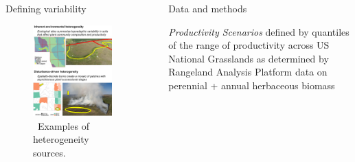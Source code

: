 \begin{frame}[t]
\begin{columns}[t]
\begin{column}{\onecolwid}
\begin{block}{Defining variability}
\begin{figure}
\includegraphics[width=8.5in]{figure/HeterogeneitySources}
\caption{~Examples of heterogeneity sources.}
\label{HetSources}
\end{figure}

\end{block}
\end{column} 


\begin{column}{\sepwid}\end{column} %

\begin{column}{\twocolwid} %

\begin{columns}[T] %
	
\begin{column}{0.4\textwidth} %

	\vspace{-2.5cm}	
	\begin{alertblock}{Data and methods}
		\small{
		\raggedright
		\emph{Productivity Scenarios} defined by quantiles of the range of productivity across US National Grasslands as determined by Rangeland Analysis Platform data on perennial + annual herbaceous biomass
		\begin{center}
			\begin{figure}
	

\end{figure}
\end{center}}
\end{alertblock}
\end{column}
\end{columns}
\end{column}
\end{columns}
\end{frame}
